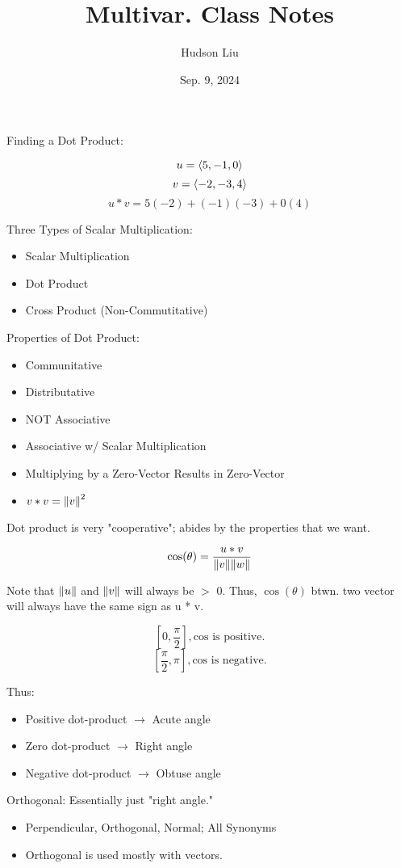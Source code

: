 \documentclass{article}
\title{Multivar. Class Notes}
\author{Hudson Liu}
\date{Sep. 9, 2024}
\DeclarePairedDelimiter{\opair}{\langle}{\rangle}
\begin{document}
\maketitle
Finding a Dot Product:

\[u=\opair{5, -1, 0}\]
\[v=\opair{-2, -3, 4}\]
\[u * v = 5(-2) + (-1)(-3) + 0(4)\]

Three Types of Scalar Multiplication:
\begin{itemize}
  \item Scalar Multiplication
  \item Dot Product
  \item Cross Product (Non-Commutitative)
\end{itemize}

Properties of Dot Product:
\begin{itemize}
  \item Communitative
  \item Distributative
  \item NOT Associative
  \item Associative w/ Scalar Multiplication
  \item Multiplying by a Zero-Vector Results in Zero-Vector
  \item $v * v = \norm{v}^2$
\end{itemize}

Dot product is very "cooperative"; abides by the properties that we want.

\[
  \cos(\theta)=\frac{ u*v }{ \norm{v} \norm{w} }
\]

Note that $\norm{u}$ and $\norm{v}$ will always be $>$ 0. Thus, $\cos(\theta)$ btwn. two vector will always have the same sign as u * v.

\[
  [0, \frac{\pi}{2}], \text{cos is positive.}
\]
\[
  [\frac{\pi}{2}, \pi], \text{cos is negative.}
\]

Thus:
\begin{itemize}
  \item Positive dot-product $\rightarrow$ Acute angle
  \item Zero dot-product $\rightarrow$ Right angle
  \item Negative dot-product $\rightarrow$ Obtuse angle
\end{itemize}

Orthogonal: Essentially just "right angle."
\begin{itemize}
  \item Perpendicular, Orthogonal, Normal; All Synonyms
  \item Orthogonal is used mostly with vectors.
\end{itemize}
\end{document}
